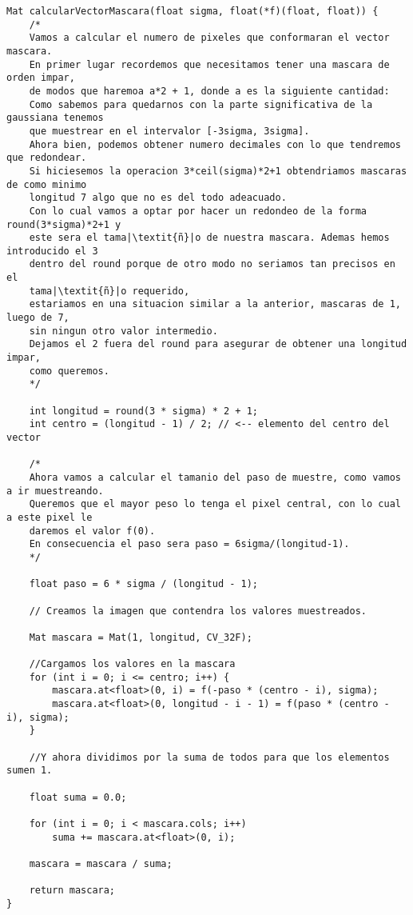 \documentclass[10pt,a4paper]{article}
\begin{document}
\begin{lstlisting}
Mat calcularVectorMascara(float sigma, float(*f)(float, float)) {
	/*
	Vamos a calcular el numero de pixeles que conformaran el vector mascara.
	En primer lugar recordemos que necesitamos tener una mascara de orden impar,
	de modos que haremoa a*2 + 1, donde a es la siguiente cantidad:
	Como sabemos para quedarnos con la parte significativa de la gaussiana tenemos
	que muestrear en el intervalor [-3sigma, 3sigma].
	Ahora bien, podemos obtener numero decimales con lo que tendremos que redondear.
	Si hiciesemos la operacion 3*ceil(sigma)*2+1 obtendriamos mascaras de como minimo
	longitud 7 algo que no es del todo adeacuado.
	Con lo cual vamos a optar por hacer un redondeo de la forma round(3*sigma)*2+1 y 
	este sera el tama|\textit{ñ}|o de nuestra mascara. Ademas hemos introducido el 3
	dentro del round porque de otro modo no seriamos tan precisos en el 
	tama|\textit{ñ}|o requerido,
	estariamos en una situacion similar a la anterior, mascaras de 1, luego de 7,
	sin ningun otro valor intermedio.
	Dejamos el 2 fuera del round para asegurar de obtener una longitud impar,
	como queremos.
	*/

	int longitud = round(3 * sigma) * 2 + 1;
	int centro = (longitud - 1) / 2; // <-- elemento del centro del vector

	/*
	Ahora vamos a calcular el tamanio del paso de muestre, como vamos a ir muestreando.
	Queremos que el mayor peso lo tenga el pixel central, con lo cual a este pixel le 
	daremos el valor f(0).
	En consecuencia el paso sera paso = 6sigma/(longitud-1).
	*/

	float paso = 6 * sigma / (longitud - 1);

	// Creamos la imagen que contendra los valores muestreados.

	Mat mascara = Mat(1, longitud, CV_32F);

	//Cargamos los valores en la mascara
	for (int i = 0; i <= centro; i++) {
		mascara.at<float>(0, i) = f(-paso * (centro - i), sigma);
		mascara.at<float>(0, longitud - i - 1) = f(paso * (centro - i), sigma);
	}

	//Y ahora dividimos por la suma de todos para que los elementos sumen 1.

	float suma = 0.0;

	for (int i = 0; i < mascara.cols; i++)
		suma += mascara.at<float>(0, i);

	mascara = mascara / suma;

	return mascara;
}
\end{lstlisting}
\end{document}
